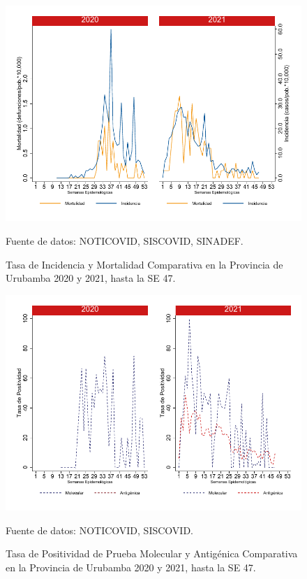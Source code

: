 \documentclass[12pt,a4paper,openany]{book}
\begin{document}
		\begin{figure}[h]
			\caption{Tasa de Incidencia y Mortalidad Comparativa en la Provincia de Urubamba 2020 y 2021, hasta la SE 47.}\label{fig:inc_urub}
			\begin{center}
				\includegraphics[width=0.7\linewidth]{../figuras/incidencia_mortalidad_20_21_13}
			\end{center}
			{\footnotesize {Fuente de datos: NOTICOVID, SISCOVID, SINADEF.}}
		\end{figure}
		
		\begin{figure}[h]
			\caption{Tasa de Positividad de Prueba Molecular y Antigénica Comparativa en la Provincia de Urubamba 2020 y 2021, hasta la SE 47.}\label{fig:positividad_urub}
			\begin{center}
				\includegraphics[width=0.7\linewidth]{../figuras/positividad_20_21_13}
			\end{center}
			{\footnotesize {Fuente de datos: NOTICOVID, SISCOVID.}}
		\end{figure}
		
\end{document}
